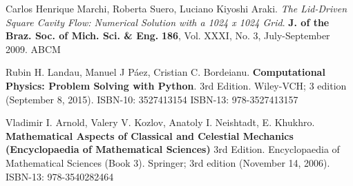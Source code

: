 \documentclass[10pt]{amsart}
\begin{document}
\begin{thebibliography}{9}
  Carlos Henrique Marchi, Roberta Suero, Luciano Kiyoshi Araki.  \emph{The Lid-Driven Square Cavity Flow: Numerical Solution with a 1024 x 1024 Grid}.  \textbf{J. of the Braz. Soc. of Mich. Sci. \& Eng.}  \textbf{186}, Vol. XXXI, No. 3, July-September 2009.  ABCM

Rubin H. Landau, Manuel J P\'{a}ez, Cristian C. Bordeianu.  \textbf{Computational Physics: Problem Solving with Python}.  3rd Edition.  Wiley-VCH; 3 edition (September 8, 2015).  ISBN-10: 3527413154  ISBN-13: 978-3527413157


Vladimir I. Arnold, Valery V. Kozlov, Anatoly I. Neishtadt, E. Khukhro.  \textbf{Mathematical Aspects of Classical and Celestial Mechanics (Encyclopaedia of Mathematical Sciences)} 3rd Edition.  Encyclopaedia of Mathematical Sciences (Book 3).  Springer; 3rd edition (November 14, 2006).  ISBN-13: 978-3540282464



  
\end{thebibliography}
\end{document}

